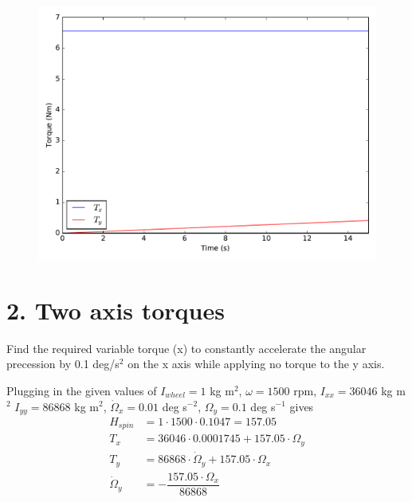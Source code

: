 \documentclass[onecolumn,10pt]{jhwhw}
\begin{document}
\begin{figure}[tbh!]
\begin{center}
\includegraphics[height=0.45\textheight]{p3_a.pdf}
\end{center}
\end{figure}

\part{2. Two axis torques}
Find the required variable torque (x) to constantly accelerate the angular precession by 0.1 deg/s$^2$ on the x axis while applying no torque to the y axis.

Plugging in the given values of $I_{wheel} = 1$ kg m$^2$, $\omega = 1500$ rpm, $I_{xx} = 36046$ kg m$^2$ $I_{yy} = 86868$ kg m$^2$, $\dot{\Omega}_x = 0.01$ deg s$^{-2}$, $\Omega_y = 0.1$ deg s$^{-1}$ gives
\begin{align*}
H_{spin} &= 1 \cdot 1500 \cdot 0.1047 = 157.05 \\
T_x &= 36046 \cdot 0.0001745 + 157.05 \cdot \Omega_y \\
T_y &= 86868 \cdot \dot{\Omega}_y + 157.05 \cdot \Omega_x \\
\dot{\Omega}_y &= -\dfrac{157.05 \cdot \Omega_x}{86868} \\
\end{align*}
\end{document}
